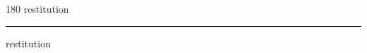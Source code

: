 
\begin{frame}
\begin{center}
\begin{turn}{180}
{\fontsize{2.5cm}{1em}\selectfont restitution}
\end{turn}
\vspace{1em}\par  
\hrule
\vspace{1em}\par  
{\fontsize{2.5cm}{1em}\selectfont restitution}
\end{center}
\end{frame}

